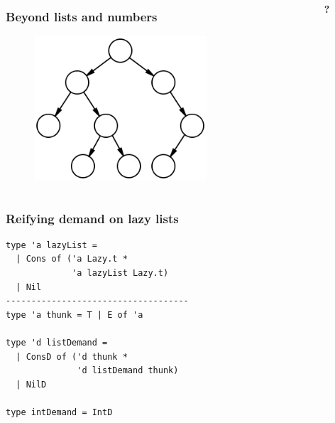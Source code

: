\documentclass{beamer}
\begin{document}
\begin{frame}[fragile]
\begin{columns}
\begin{column}{0.7\textwidth}
\frametitle{Beyond lists and numbers}
\begin{figure}
\centering
\includegraphics[width=0.7\textwidth]{binary-tree}
\end{figure}
\end{column}
\begin{column}{0.2\textwidth}
{\fontsize{100}{50}\textrm{\textbf{?}}}
\end{column}
\end{columns}
\end{frame}


\begin{frame}[fragile]
  \frametitle{Reifying demand on lazy lists}
\begin{verbatim}
type 'a lazyList =
  | Cons of ('a Lazy.t *
             'a lazyList Lazy.t)
  | Nil
------------------------------------
type 'a thunk = T | E of 'a

type 'd listDemand =
  | ConsD of ('d thunk *
              'd listDemand thunk)
  | NilD

type intDemand = IntD
\end{verbatim}
\end{frame}
\end{document}
